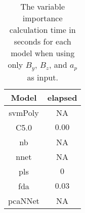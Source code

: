 \begin{table}[!ht]
	\centering
	\begin{tabular}{|c|c|}
		\hline
		Model & elapsed \\ \hline
		svmPoly & NA \\ \hline
		C5.0 & $0.00$ \\ \hline
		nb & NA \\ \hline
		nnet & NA \\ \hline
		pls & $0$ \\ \hline
		fda & $0.03$ \\ \hline
		pcaNNet & NA \\ \hline
	\end{tabular}
	\caption{The variable importance calculation time in seconds for each model when using only $B_{y}$, $B_{z}$, and $a_{p}$ as input.}
	\label{tab:time:yzap:importance}
\end{table}
